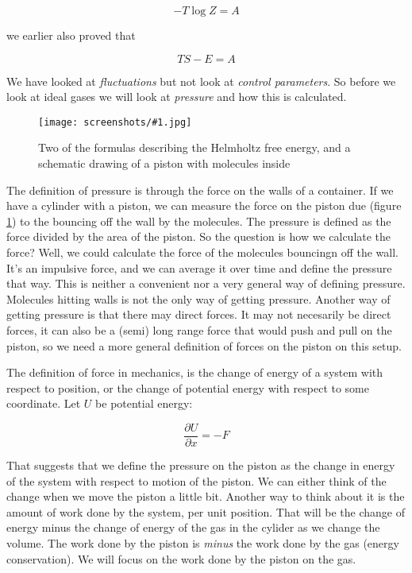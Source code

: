\documentclass[a4, 12pt, english, USenglish]{scrreprt}
\newcommand{\screenshot}[2]{
\begin{figure}[htb]
\texttt{[image: screenshots/\#1.jpg]}
\label{#1}
\caption{#2}
\end{figure}}
\newcommand{\idx}[1]{{\em #1}\index{#1}}
\begin{document}
\[
 -T \log Z = A
\]

we earlier also proved that

\[
TS - E = A 
\]

We have looked at \idx{fluctuations} but not look at \idx{control
parameters}.  So before we look at ideal gases we will look at
\idx{pressure} and how this is calculated.

\screenshot{helmholtzfreepiston}{Two of the formulas describing the
  Helmholtz free energy, and a schematic drawing of a piston with
  molecules inside}

The definition of pressure is through the force on the walls of a
container.  If we have  a cylinder with a piston, we can measure the
force on the piston due  (figure \ref{helmholtzfreepiston}) to the
bouncing off the wall by the molecules.  The pressure is defined as
the force divided by the area of the piston.  So the question is how
we calculate the force? Well, we could calculate the force of the
molecules bouncingn off the wall. It's an impulsive force, and we can
average it over time and define the pressure that way.  This is
neither a convenient nor a very general way of defining pressure.
Molecules hitting walls is not the only way of getting pressure.
Another way of getting pressure is that there may direct forces.  It
may not necesarily be direct forces, it can also be a (semi) long
range force that would push and pull on the piston, so we need a more
general definition of forces on the piston on this setup.

The definition of force in mechanics, is the change of energy of a
system with respect to position, or the change of potential energy
with respect to some coordinate.  Let \(U\) be potential energy:

\[
\frac{\partial U}{\partial x} = - F
\]

That suggests that we define the pressure on the piston as the change
in energy of the system with respect to motion of the piston.  We can
either think of the change when we move the piston a little bit.
Another way to think about it is the amount of work done by the
system, per unit position.  That will be the change of energy minus
the change of energy of the gas in the cylider as we change the
volume.  The work done by the piston is {\em  minus} the work done by
the gas (energy conservation).  We will focus on the work done by the
piston on the gas.


\printindex
\end{document}

